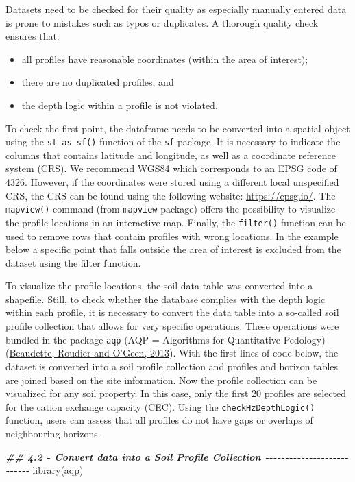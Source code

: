 \documentclass[
  10pt,
  b5paper,
  oneside]{book}
\newenvironment{Shaded}{\begin{snugshade}}{\end{snugshade}}
\newcommand{\DocumentationTok}[1]{\textcolor[rgb]{0.56,0.35,0.01}{\textbf{\textit{#1}}}}
\newcommand{\FunctionTok}[1]{\textcolor[rgb]{0.00,0.00,0.00}{#1}}
\newcommand{\NormalTok}[1]{#1}
\providecommand{\tightlist}{%
  \setlength{\itemsep}{0pt}\setlength{\parskip}{0pt}}
\begin{document}
Datasets need to be checked for their quality as especially manually entered data is prone to mistakes such as typos or duplicates. A thorough quality check ensures that:

\begin{itemize}
\tightlist
\item
  all profiles have reasonable coordinates (within the area of interest);
\item
  there are no duplicated profiles; and
\item
  the depth logic within a profile is not violated.
\end{itemize}

To check the first point, the dataframe needs to be converted into a spatial object using the \texttt{st\_as\_sf()} function of the \texttt{sf} package. It is necessary to indicate the columns that contains latitude and longitude, as well as a coordinate reference system (CRS). We recommend WGS84 which corresponds to an EPSG code of 4326. However, if the coordinates were stored using a different local unspecified CRS, the CRS can be found using the following website: \url{https://epsg.io/}. The \texttt{mapview()} command (from \texttt{mapview} package) offers the possibility to visualize the profile locations in an interactive map. Finally, the \texttt{filter()} function can be used to remove rows that contain profiles with wrong locations. In the example below a specific point that falls outside the area of interest is excluded from the dataset using the filter function.

To visualize the profile locations, the soil data table was converted into a shapefile. Still, to check whether the database complies with the depth logic within each profile, it is necessary to convert the data table into a so-called soil profile collection that allows for very specific operations. These operations were bundled in the package \texttt{aqp} (AQP = Algorithms for Quantitative Pedology) (\protect\hyperlink{ref-beaudette2013}{Beaudette, Roudier and O'Geen, 2013}).
With the first lines of code below, the dataset is converted into a soil profile collection and profiles and horizon tables are joined based on the site information.
Now the profile collection can be visualized for any soil property. In this case, only the first 20 profiles are selected for the cation exchange capacity (CEC).
Using the \texttt{checkHzDepthLogic()} function, users can assess that all profiles do not have gaps or overlaps of neighbouring horizons.

\begin{Shaded}
\begin{Highlighting}[]
\DocumentationTok{\#\# 4.2 {-} Convert data into a Soil Profile Collection {-}{-}{-}{-}{-}{-}{-}{-}{-}{-}{-}{-}{-}{-}{-}{-}{-}{-}{-}{-}{-}{-}{-}{-}{-}{-}{-}}
\FunctionTok{library}\NormalTok{(aqp)}
\end{Highlighting}
\end{Shaded}
\end{document}
